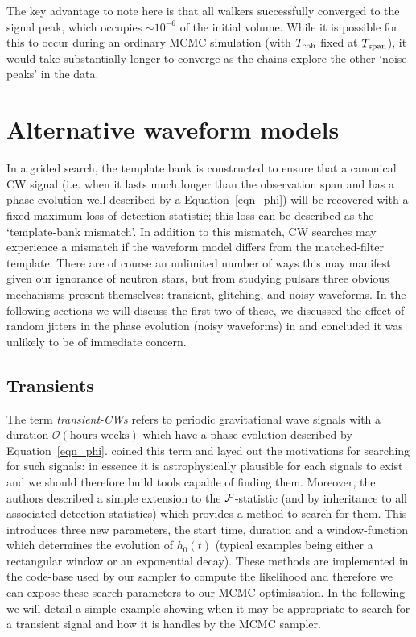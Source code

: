 \documentclass[aps, prd, twocolumn, superscriptaddress, floatfix, showpacs, nofootinbib, longbibliography]{revtex4-1}
\begin{document}
The key advantage to note here is that all walkers successfully converged to the
signal peak, which occupies $\sim 10^{-6}$ of the initial volume. While it is
possible for this to occur during an ordinary MCMC simulation (with $T_{\rm coh}$
fixed at $T_{\rm span}$), it would take substantially longer to converge as the
chains explore the other `noise peaks' in the data.

\section{Alternative waveform models}

In a grided search, the template bank is constructed to ensure that a canonical
CW signal (i.e. when it lasts much longer than the observation span and has a
phase evolution well-described by a Equation~\eqref{eqn_phi}) will be
recovered with a fixed maximum loss of detection statistic; this loss can be
described as the `template-bank mismatch'. In addition to this mismatch, CW
searches may experience a mismatch if the waveform model differs from the
matched-filter template. There are of course an unlimited number of ways this
may manifest given our ignorance of neutron stars, but from studying pulsars
three obvious mechanisms present themselves: transient, glitching, and noisy
waveforms. In the following sections we will discuss the first two of these, we
discussed the effect of random jitters in the phase evolution (noisy waveforms)
in \citet{ashton2015} and concluded it was unlikely to be of immediate concern.

\subsection{Transients}
\label{sec_transients}

The term \emph{transient-CWs} refers to periodic gravitational wave signals
with a duration $\mathcal{O}(\textrm{hours-weeks})$ which have a
phase-evolution described by Equation~\eqref{eqn_phi}. \citet{prix2011} coined
this term and layed out the motivations for searching for such signals: in
essence it is astrophysically plausible for each signals to exist and we should
therefore build tools capable of finding them. Moreover, the authors described
a simple extension to the ${\mathcal{F}}$-statistic (and by inheritance to all associated
detection statistics) which provides a method to search for them. This
introduces three new parameters, the start time, duration and a window-function
which determines the evolution of $h_0(t)$ (typical examples being either a
rectangular window or an exponential decay). These methods are implemented in
the code-base used by our sampler to compute the likelihood and therefore we
can expose these search parameters to our MCMC optimisation. In the following
we will detail a simple example showing when it may be appropriate to search for
a transient signal and how it is handles by the MCMC sampler.
\end{document}
